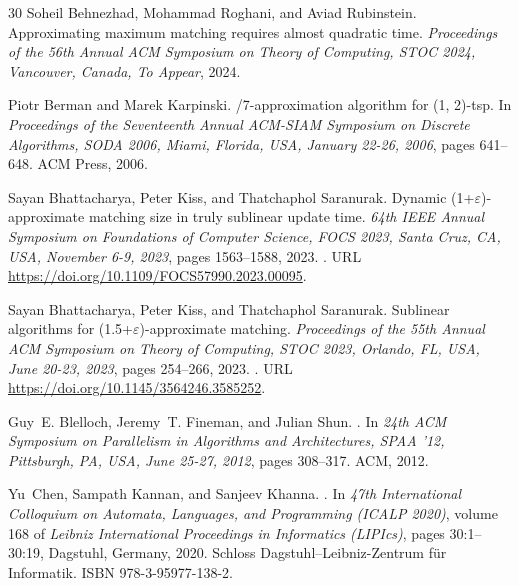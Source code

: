 \documentclass[letterpaper,11pt]{article}
\renewcommand{\epsilon}{\varepsilon}
\begin{document}
\begin{thebibliography}{30}
Soheil Behnezhad, Mohammad Roghani, and Aviad Rubinstein.
\newblock Approximating maximum matching requires almost quadratic time.
\newblock \emph{Proceedings of the 56th Annual ACM Symposium on Theory of
  Computing, {STOC} 2024, Vancouver, Canada, To Appear}, 2024.

Piotr Berman and Marek Karpinski.
/7-approximation algorithm for (1, 2)-tsp.
\newblock In \emph{Proceedings of the Seventeenth Annual {ACM-SIAM} Symposium
  on Discrete Algorithms, {SODA} 2006, Miami, Florida, USA, January 22-26,
  2006}, pages 641--648. {ACM} Press, 2006.

Sayan Bhattacharya, Peter Kiss, and Thatchaphol Saranurak.
\newblock Dynamic (1+$\epsilon$)-approximate matching size in truly sublinear
  update time.
\newblock \emph{64th {IEEE} Annual Symposium on Foundations of Computer
  Science, {FOCS} 2023, Santa Cruz, CA, USA, November 6-9, 2023}, pages
  1563--1588, 2023{}.
\newblock {}.
\newblock URL \url{https://doi.org/10.1109/FOCS57990.2023.00095}.

Sayan Bhattacharya, Peter Kiss, and Thatchaphol Saranurak.
\newblock Sublinear algorithms for (1.5+{\(\epsilon\)})-approximate matching.
\newblock \emph{Proceedings of the 55th Annual {ACM} Symposium on Theory of
  Computing, {STOC} 2023, Orlando, FL, USA, June 20-23, 2023}, pages 254--266,
  2023{}.
\newblock {}.
\newblock URL \url{https://doi.org/10.1145/3564246.3585252}.

Guy~E. Blelloch, Jeremy~T. Fineman, and Julian Shun.
.
\newblock In \emph{24th {ACM} Symposium on Parallelism in Algorithms and
  Architectures, {SPAA} '12, Pittsburgh, PA, USA, June 25-27, 2012}, pages
  308--317. {ACM}, 2012.

Yu~Chen, Sampath Kannan, and Sanjeev Khanna.
.
\newblock In \emph{47th International Colloquium on Automata, Languages, and
  Programming (ICALP 2020)}, volume 168 of \emph{Leibniz International
  Proceedings in Informatics (LIPIcs)}, pages 30:1--30:19, Dagstuhl, Germany,
  2020. Schloss Dagstuhl--Leibniz-Zentrum f{\"u}r Informatik.
\newblock ISBN 978-3-95977-138-2.


\end{thebibliography}
\end{document}
